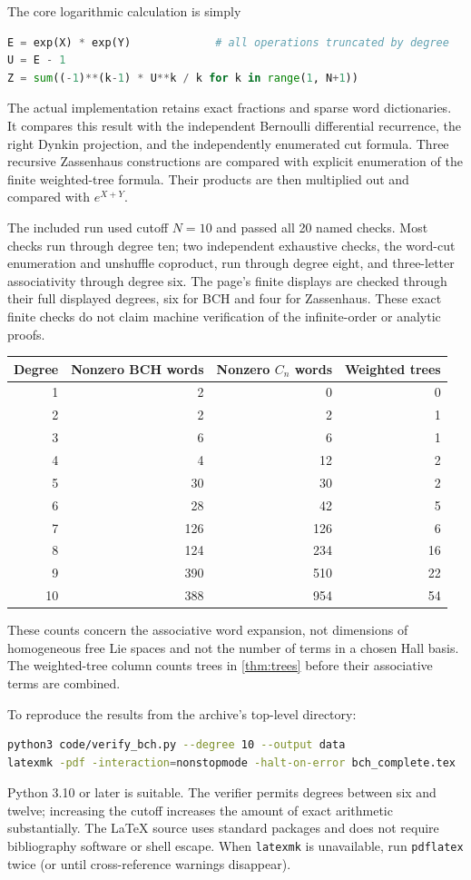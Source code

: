 \documentclass[11pt]{article}
\numberwithin{equation}{section}
\theoremstyle{definition}
\theoremstyle{remark}
\begin{document}
The core logarithmic calculation is simply
\begin{lstlisting}[language=Python]
E = exp(X) * exp(Y)             # all operations truncated by degree
U = E - 1
Z = sum((-1)**(k-1) * U**k / k for k in range(1, N+1))
\end{lstlisting}
The actual implementation retains exact fractions and sparse word
dictionaries. It compares this result with the independent
Bernoulli differential recurrence, the right Dynkin projection,
and the independently enumerated cut formula. Three recursive
Zassenhaus constructions are compared with explicit enumeration
of the finite weighted-tree formula. Their products are then
multiplied out and compared with $e^{X+Y}$.

The included run used cutoff $N=10$ and passed all 20 named checks.
Most checks run through degree ten; two independent exhaustive
checks, the word-cut enumeration and unshuffle coproduct, run
through degree eight, and three-letter associativity through
degree six. The page's finite displays are checked through their
full displayed degrees, six for BCH and four for Zassenhaus.
These exact finite checks do not claim machine verification of
the infinite-order or analytic proofs.

\begin{center}
\begin{tabular}{rrrr}
\toprule
Degree & Nonzero BCH words & Nonzero $C_n$ words & Weighted trees\\
\midrule
1&2&0&0\\
2&2&2&1\\
3&6&6&1\\
4&4&12&2\\
5&30&30&2\\
6&28&42&5\\
7&126&126&6\\
8&124&234&16\\
9&390&510&22\\
10&388&954&54\\
\bottomrule
\end{tabular}
\end{center}
These counts concern the associative word expansion, not dimensions
of homogeneous free Lie spaces and not the number of terms in a
chosen Hall basis. The weighted-tree column counts trees in
\cref{thm:trees} before their associative terms are combined.

To reproduce the results from the archive's top-level directory:
\begin{lstlisting}[language=bash]
python3 code/verify_bch.py --degree 10 --output data
latexmk -pdf -interaction=nonstopmode -halt-on-error bch_complete.tex
\end{lstlisting}
Python 3.10 or later is suitable. The verifier permits degrees
between six and twelve; increasing the cutoff increases the amount
of exact arithmetic substantially. The LaTeX source uses standard
packages and does not require bibliography software or shell escape.
When \texttt{latexmk} is unavailable, run \texttt{pdflatex} twice
(or until cross-reference warnings disappear).
\end{document}
